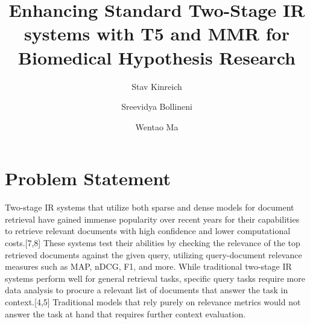 \documentclass[sigconf]{acmart}
\begin{document}
\title{Enhancing Standard Two-Stage IR systems with T5 and MMR for Biomedical Hypothesis Research}

\author{Stav Kinreich}

\author{Sreevidya Bollineni}

\author{Wentao Ma}

\maketitle

\section{Problem Statement}
  Two-stage IR systems that utilize both sparse and dense models for document retrieval have gained immense popularity over recent years for their capabilities to retrieve relevant documents with high confidence and lower computational costs.[7,8] These systems test their abilities by checking the relevance of the top retrieved documents against the given query, utilizing query-document relevance measures such as MAP, nDCG, F1, and more. While traditional two-stage IR systems perform well for general retrieval tasks, specific query tasks require more data analysis to procure a relevant list of documents that answer the task in context.[4,5] Traditional models that rely purely on relevance metrics would not answer the task at hand that requires further context evaluation.
  
\end{document}
